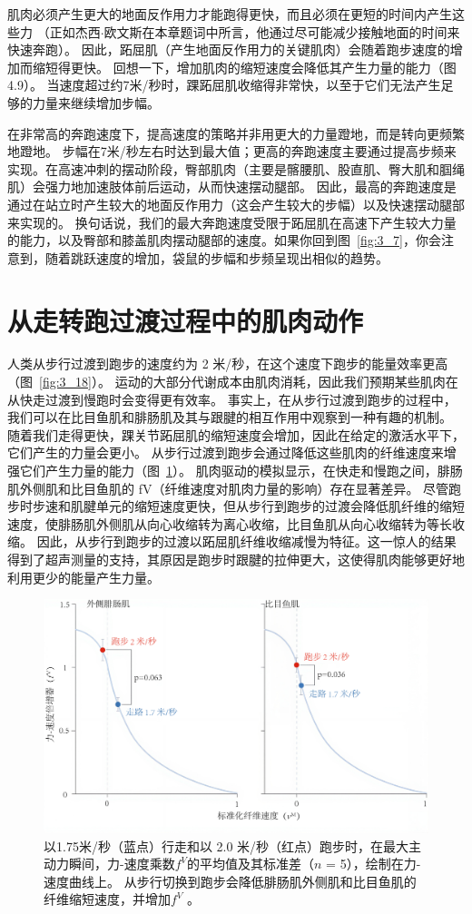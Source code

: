 肌肉必须产生更大的地面反作用力才能跑得更快，而且必须在更短的时间内产生这些力
（正如杰西$\cdot$欧文斯在本章题词中所言，他通过尽可能减少接触地面的时间来快速奔跑）。
因此，跖屈肌（产生地面反作用力的关键肌肉）会随着跑步速度的增加而缩短得更快。
回想一下，增加肌肉的缩短速度会降低其产生力量的能力（图4.9）。
当速度超过约7米/秒时，踝跖屈肌收缩得非常快，以至于它们无法产生足够的力量来继续增加步幅。


在非常高的奔跑速度下，提高速度的策略并非用更大的力量蹬地，而是转向更频繁地蹬地。
步幅在7米/秒左右时达到最大值；更高的奔跑速度主要通过提高步频来实现。在高速冲刺的摆动阶段，臀部肌肉（主要是髂腰肌、股直肌、臀大肌和腘绳肌）会强力地加速肢体前后运动，从而快速摆动腿部。
因此，最高的奔跑速度是通过在站立时产生较大的地面反作用力（这会产生较大的步幅）以及快速摆动腿部来实现的。
换句话说，我们的最大奔跑速度受限于跖屈肌在高速下产生较大力量的能力，以及臀部和膝盖肌肉摆动腿部的速度。如果你回到图~\ref{fig:3_7}，你会注意到，随着跳跃速度的增加，袋鼠的步幅和步频呈现出相似的趋势。


\section{从走转跑过渡过程中的肌肉动作}

人类从步行过渡到跑步的速度约为 2 米/秒，在这个速度下跑步的能量效率更高（图~\ref{fig:3_18}）。
运动的大部分代谢成本由肌肉消耗，因此我们预期某些肌肉在从快走过渡到慢跑时会变得更有效率。
事实上，在从步行过渡到跑步的过程中，我们可以在比目鱼肌和腓肠肌及其与跟腱的相互作用中观察到一种有趣的机制。
随着我们走得更快，踝关节跖屈肌的缩短速度会增加，因此在给定的激活水平下，它们产生的力量会更小。
从步行过渡到跑步会通过降低这些肌肉的纤维速度来增强它们产生力量的能力（图~\ref{fig:12_6}）。
肌肉驱动的模拟显示，在快走和慢跑之间，腓肠肌外侧肌和比目鱼肌的 fV（纤维速度对肌肉力量的影响）存在显著差异。
尽管跑步时步速和肌腱单元的缩短速度更快，但从步行到跑步的过渡会降低肌纤维的缩短速度，使腓肠肌外侧肌从向心收缩转为离心收缩，比目鱼肌从向心收缩转为等长收缩。
因此，从步行到跑步的过渡以跖屈肌纤维收缩减慢为特征。这一惊人的结果得到了超声测量\cite{farris2012human}的支持，其原因是跑步时跟腱的拉伸更大，这使得肌肉能够更好地利用更少的能量产生力量。


\begin{figure}[!htb]
	\centering
	\includegraphics[width=0.8\linewidth]{chap12/12_6}
	\caption{以1.75米/秒（蓝点）行走和以 2.0 米/秒（红点）跑步时，在最大主动力瞬间，力-速度乘数$f^V$的平均值及其标准差（$n$ = 5），绘制在力-速度曲线上。
		从步行切换到跑步会降低腓肠肌外侧肌和比目鱼肌的纤维缩短速度，并增加$f^V$ \cite{arnold2013muscle}。 \label{fig:12_6}}
\end{figure}



